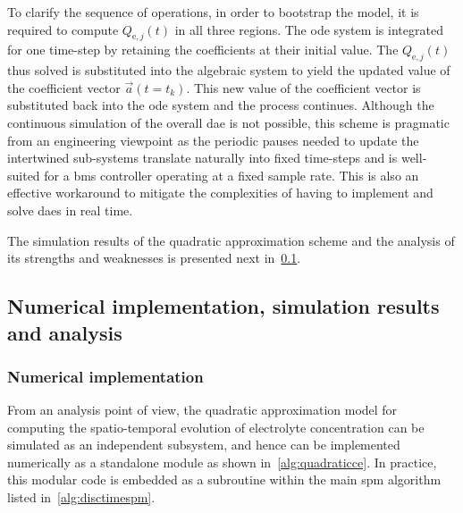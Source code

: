 To clarify the  sequence of operations, in  order to bootstrap the  model, it is
required  to compute  $Q_{\text{e},j}(t)$ in  all three  regions. The  \gls{ode}
system  is  integrated  for  one  time-step by  retaining  the  coefficients  at
their initial  value. The  $Q_{\text{e},j}(t)$ thus  solved is  substituted into
the  algebraic system  to  yield the  updated value  of  the coefficient  vector
$\vec{a}(t=t_k)$. This new  value of the coefficient vector  is substituted back
into the  \gls{ode} system  and the process  continues. Although  the continuous
simulation of  the overall \gls{dae} is  not possible, this scheme  is pragmatic
from  an engineering  viewpoint  as the  periodic pauses  needed  to update  the
intertwined  sub-systems  translate  naturally  into  fixed  time-steps  and  is
well-suited for a \gls{bms} controller operating at a fixed sample rate. This is
also an effective workaround to mitigate the complexities of having to implement
and solve \glspl{dae} in real time.

The   simulation   results   of   the   quadratic   approximation   scheme   and
the   analysis   of   its   strengths   and   weaknesses   is   presented   next
in~\cref{subsec:quadraticsimresultsanalysis}.

\subsection{Numerical implementation, simulation results and analysis}\label{subsec:quadraticsimresultsanalysis}

\subsubsection*{Numerical implementation}
From an analysis point of view,  the quadratic approximation model for computing
the spatio-temporal evolution  of electrolyte concentration can  be simulated as
an  independent  subsystem,  and  hence  can be  implemented  numerically  as  a
standalone module as shown  in~\cref{alg:quadraticce}. In practice, this modular
code is  embedded as  a subroutine  within the  main \gls{spm}  algorithm listed
in~\cref{alg:disctimespm}.



